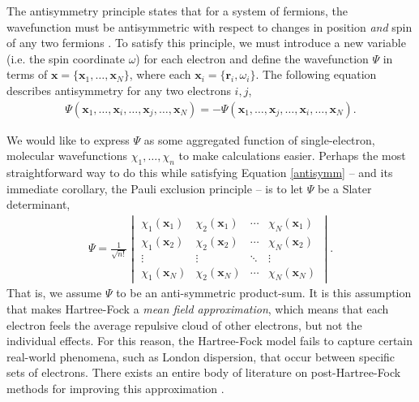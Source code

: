 \documentclass[12pt]{article}
\newcommand{\vect}[1]{\boldsymbol{#1}}
\begin{document}
The antisymmetry principle states that for a system of fermions, the wavefunction must be antisymmetric with respect to changes in position \emph{and} spin of any two fermions \cite{sherrill2001}.  To satisfy this principle, we must introduce a new variable (i.e. the spin coordinate $\omega$) for each electron and define the wavefunction $\Psi$ in terms of $\vect{x} = \{\vect{x}_1, \ldots, \vect{x}_N\}$, where each $\vect{x}_i = \{\vect{r}_i, \omega_i\}$.  The following equation describes antisymmetry for any two electrons $i, j$,  
\begin{align}
\Psi(\vect{x}_1, \ldots, \vect{x}_i, \ldots, \vect{x}_j, \ldots, \vect{x}_N) = -\Psi(\vect{x}_1, \ldots, \vect{x}_j, \ldots, \vect{x}_i, \ldots, \vect{x}_N). \label{antisymm}
\end{align}  

We would like to express $\Psi$ as some aggregated function of single-electron, molecular wavefunctions $\chi_1, \ldots, \chi_n$ to make calculations easier.  Perhaps the most straightforward way to do this while satisfying Equation \ref{antisymm}  -- and its immediate corollary, the Pauli exclusion principle -- is to let $\Psi$ be a Slater determinant,
\begin{align}
\Psi = \frac{1}{\sqrt{n!}} 
\begin{vmatrix}
\chi_1(\vect x_1) & \chi_2(\vect x_1)  & \cdots & \chi_N(\vect x_1) \\
\chi_1(\vect x_2) & \chi_2(\vect x_2)  & \cdots & \chi_N(\vect x_2) \\
\vdots & \vdots & \ddots & \vdots \\
\chi_1(\vect x_N) & \chi_2(\vect x_N) & \cdots & \chi_N(\vect x_N) 
\end{vmatrix}.
\end{align} 
That is, we assume $\Psi$ to be an anti-symmetric product-sum.  It is this assumption that makes Hartree-Fock a \emph{mean field approximation}, which means that each electron feels the average repulsive cloud of other electrons, but not the individual effects.  For this reason, the Hartree-Fock model fails to capture certain real-world phenomena, such as London dispersion, that occur between specific sets of electrons.  There exists an entire body of literature on post-Hartree-Fock methods for improving this approximation \cite{bartlett1994applications}.       
\end{document}
